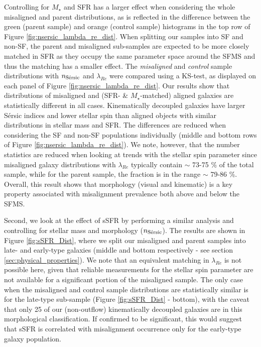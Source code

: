 \documentclass[fleqn,usenatbib]{mnras}
\begin{document}
Controlling for $M_{\star}$ and SFR has a larger effect when considering the whole misaligned and parent distributions, as is reflected in the difference between the green (parent sample) and orange (control sample) histograms in the top row of Figure \ref{fig:nsersic_lambda_re_dist}. When splitting our samples into SF and non-SF, the parent and misaligned sub-samples are expected to be more closely matched in SFR as they occupy the same parameter space around the SFMS and thus the matching has a smaller effect. The \textit{misaligned} and \textit{control} sample distributions with $n_{\rm{S\Acute{e}rsic}}$ and $\lambda_{Re}$ were compared using a KS-test, as displayed on each panel of Figure \ref{fig:nsersic_lambda_re_dist}. Our results show that distributions of misaligned and (SFR- \& $M_{\star}$-matched) aligned galaxies are statistically different in all cases. Kinematically decoupled galaxies have larger S\'ersic indices and lower stellar spin than aligned objects with similar distributions in stellar mass and SFR. The differences are reduced when considering the SF and non-SF populations individually (middle and bottom rows of Figure \ref{fig:nsersic_lambda_re_dist}). We note, however, that the number statistics are reduced when looking at trends with the stellar spin parameter since misaligned galaxy distributions with $\lambda_{Re}$ typically contain $\sim$ 73-75 \% of the total sample, while for the parent sample, the fraction is in the range $\sim$ 79-86 \%. Overall, this result shows that morphology (visual and kinematic) is a key property associated with misalignment prevalence both above and below the SFMS.


Second, we look at the effect of sSFR by performing a similar analysis and controlling for stellar mass and morphology ($n_{\rm{S\Acute{e}rsic}}$). The results are shown in Figure \ref{fig:sSFR_Dist}, where we split our misaligned and parent samples into late- and early-type galaxies (middle and bottom respectively - see section \ref{sec:physical_properties}).
We note that an equivalent matching in $\lambda_{Re}$ is not possible here, given that reliable measurements for the stellar spin parameter are not available for a significant portion of the misaligned sample.
The only case when the misaligned and control sample distributions are statistically similar is for the late-type sub-sample (Figure \ref{fig:sSFR_Dist} - bottom), with the caveat that only 25 of our (non-outflow) kinematically decoupled galaxies are in this morphological classification. If confirmed to be significant, this would suggest that sSFR is correlated with misalignment occurrence only for the early-type galaxy population.
\end{document}
